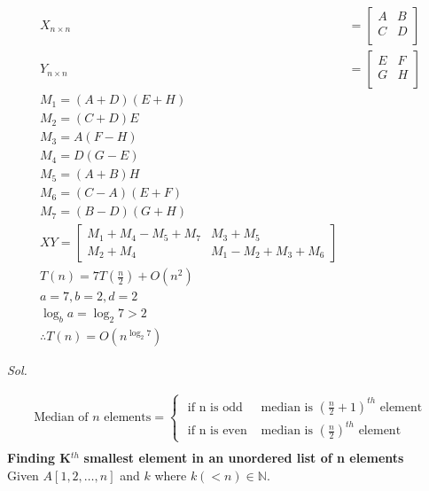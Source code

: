\begin{align*}
	X_{n \times n} & = \begin{bmatrix}
		                   A & B \\
		                   C & D \\
	                   \end{bmatrix}                  \\
	Y_{n \times n} & = \begin{bmatrix}
		                   E & F \\
		                   G & H \\
	                   \end{bmatrix}                  \\
	M_1 = (A + D)(E + H)                               \\
	M_2 = (C + D)E                                     \\
	M_3 = A(F - H)                                     \\
	M_4 = D(G - E)                                     \\
	M_5 = (A + B)H                                     \\
	M_6 = (C - A)(E + F)                               \\
	M_7 = (B - D)(G + H)                               \\
	XY = \begin{bmatrix}
		     M_1 + M_4 - M_5 + M_7 & M_3 + M_5             \\
		     M_2 + M_4             & M_1 - M_2 + M_3 + M_6
	     \end{bmatrix} \\
	T(n) = 7T\left(\frac{n}{2}\right) + O(n^2)         \\
	a = 7, b = 2, d = 2                                \\
	\log_b a = \log_2 7 > 2                            \\
	\therefore T(n) = O(n^{\log_2 7})
\end{align*}

\pagebreak


\textit{ Sol. }

\begin{align*}
	\text{Median of } n \text{ elements} = \begin{cases}
		                                       \text{ if n is odd }  & \text{median is } \left(\frac{n}{2} + 1\right)^{th} \text{ element} \\
		                                       \text{ if n is even } & \text{median is } \left(\frac{n}{2}\right)^{th} \text{ element}
	                                       \end{cases} \\
\end{align*}
\textbf{Finding K}$^{th}$ \textbf{smallest element in an unordered list of n elements} \\
Given $A[1,2,\ldots,n]$ and $k$ where $k (<n) \in \mathbb{N}$.

